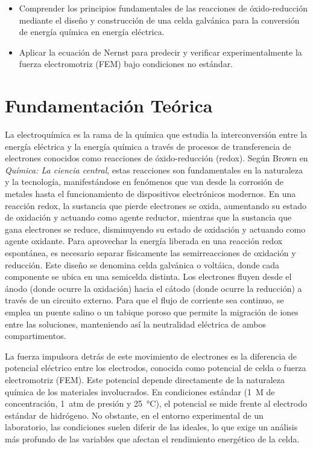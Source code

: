 \documentclass[12pt]{article}
\begin{document}
\begin{itemize}
    \item Comprender los principios fundamentales de las reacciones de
          óxido-reducción mediante el diseño y construcción de una celda
          galvánica para la conversión de energía química en energía eléctrica.
    \item Aplicar la ecuación de Nernst para predecir y verificar
          experimentalmente la fuerza electromotriz (FEM) bajo condiciones
          no estándar.
\end{itemize}

\section{Fundamentación Teórica}

La electroquímica es la rama de la química que estudia la interconversión entre
la energía eléctrica y la energía química a través de procesos de transferencia
de electrones conocidos como reacciones de óxido-reducción (redox). Según Brown
en \textit{Química: La ciencia central}, estas reacciones son fundamentales en
la naturaleza y la tecnología, manifestándose en fenómenos que van desde la
corrosión de metales hasta el funcionamiento de dispositivos electrónicos
modernos. En una reacción redox, la sustancia que pierde electrones se oxida,
aumentando su estado de oxidación y actuando como agente reductor, mientras que
la sustancia que gana electrones se reduce, disminuyendo su estado de oxidación
y actuando como agente oxidante. Para aprovechar la energía liberada en una
reacción redox espontánea, es necesario separar físicamente las semirreacciones
de oxidación y reducción. Este diseño se denomina celda galvánica o voltáica,
donde cada componente se ubica en una semicelda distinta. Los electrones fluyen
desde el ánodo (donde ocurre la oxidación) hacia el cátodo (donde ocurre la
reducción) a través de un circuito externo. Para que el flujo de corriente sea
continuo, se emplea un puente salino o un tabique poroso que permite la
migración de iones entre las soluciones, manteniendo así la neutralidad
eléctrica de ambos compartimentos.

La fuerza impulsora detrás de este movimiento de electrones es la diferencia de
potencial eléctrico entre los electrodos, conocida como potencial de celda o
fuerza electromotriz (FEM). Este potencial depende directamente de la naturaleza
química de los materiales involucrados. En condiciones estándar (1~M de
concentración, 1~atm de presión y 25~°C), el potencial se mide frente al
electrodo estándar de hidrógeno. No obstante, en el entorno experimental de un
laboratorio, las condiciones suelen diferir de las ideales, lo que exige un
análisis más profundo de las variables que afectan el rendimiento energético de
la celda.
\end{document}

